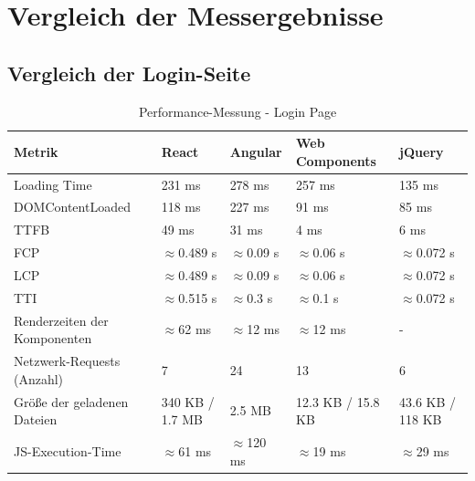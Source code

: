 \documentclass[oneside]{ausarbeitung}
\begin{document}
\section{Vergleich der Messergebnisse}
\subsection{Vergleich der Login-Seite}

\begin{table}[H]
\centering
\caption{Performance-Messung - Login Page}
\begin{tabular}{|p{3.5cm}|p{2.5cm}|p{2.5cm}|p{2.5cm}|p{2.5cm}|}
\hline
\textbf{Metrik}                  & \textbf{React} & \textbf{Angular} & \textbf{Web Components} & \textbf{jQuery} \\ \hline
Loading Time                     & 231 ms        & 278 ms           & 257 ms                 & 135 ms          \\ \hline
DOMContentLoaded                 & 118 ms        & 227 ms           & 91 ms                  & 85 ms           \\ \hline
TTFB                             & 49 ms        & 31 ms            & 4 ms                   & 6 ms            \\ \hline
FCP                              & $\approx$0.489 s & $\approx$0.09 s & $\approx$0.06 s        & $\approx$0.072 s \\ \hline
LCP                              & $\approx$0.489 s & $\approx$0.09 s & $\approx$0.06 s        & $\approx$0.072 s \\ \hline
TTI                              & $\approx$0.515 s & $\approx$0.3 s & $\approx$0.1 s         & $\approx$0.072 s \\ \hline
Renderzeiten der Komponenten     & $\approx$62 ms & $\approx$12 ms   & $\approx$12 ms         & - \\ \hline
Netzwerk-Requests (Anzahl)       & 7              & 24               & 13                    & 6               \\ \hline
Größe der geladenen Dateien      & 340 KB / 1.7 MB & 2.5 MB          & 12.3 KB / 15.8 KB     & 43.6 KB / 118 KB \\ \hline
JS-Execution-Time                & $\approx$61 ms       & $\approx$120 ms          & $\approx$19 ms                 & $\approx$29 ms         \\ \hline
\end{tabular}
\end{table}
\end{document}
